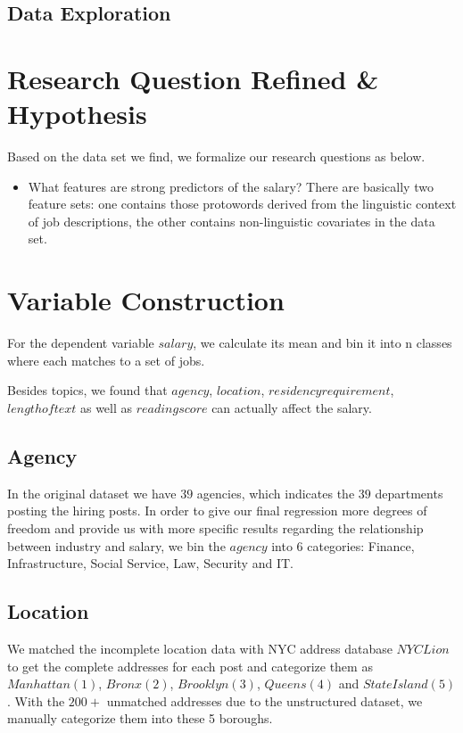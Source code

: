 \documentclass[9pt,notitlepage]{article}		%
\begin{document}
\subsection{Data Exploration}

\section{Research Question Refined \& Hypothesis}
Based on the data set we find, we formalize our research questions as below.
\begin{itemize}
\item What features are strong predictors of the salary? There are basically two feature sets: one contains those protowords derived from the linguistic context of job descriptions, the other contains non-linguistic covariates in the data set.
\end{itemize}
 \hspace{0.5cm} \vspace{0.3cm} 
\section{Variable Construction}
For the dependent variable $salary$, we calculate its mean and bin it into n classes where each matches to a set of jobs.

Besides topics, we found that $agency$, $location$, $residency requirement$, $length of text$ as well as $reading score$ can actually affect the salary.
\subsection*{Agency}
In the original dataset we have $39$ agencies, which indicates the $39$ departments posting the hiring posts. In order to give our final regression more degrees of freedom and provide us with more specific results regarding the relationship between industry and salary, we bin the $agency$ into $6$ categories: Finance, Infrastructure, Social Service, Law, Security and IT.
\subsection*{Location}
We matched the incomplete location data with NYC address database $NYC Lion$ to get the complete addresses for each post and categorize them as $Manhattan(1)$, $Bronx(2)$, $Brooklyn(3)$, $Queens(4)$ and $State Island(5)$. With the $200+$ unmatched addresses due to the unstructured dataset, we manually categorize them into these 5 boroughs.
\end{document}
